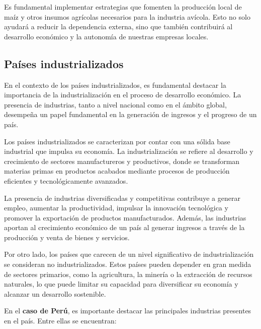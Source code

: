 \documentclass[
  a4paper,
]{article}
\begin{document}
Es fundamental implementar estrategias que fomenten la producción local
de maíz y otros insumos agrícolas necesarios para la industria avícola.
Esto no solo ayudará a reducir la dependencia externa, sino que también
contribuirá al desarrollo económico y la autonomía de nuestras empresas
locales.

\hypertarget{pauxedses-industrializados}{%
\subsection{Países industrializados}\label{pauxedses-industrializados}}

En el contexto de los países industrializados, es fundamental destacar
la importancia de la industrialización en el proceso de desarrollo
económico. La presencia de industrias, tanto a nivel nacional como en el
ámbito global, desempeña un papel fundamental en la generación de
ingresos y el progreso de un país.

Los países industrializados se caracterizan por contar con una sólida
base industrial que impulsa su economía. La industrialización se refiere
al desarrollo y crecimiento de sectores manufactureros y productivos,
donde se transforman materias primas en productos acabados mediante
procesos de producción eficientes y tecnológicamente avanzados.

La presencia de industrias diversificadas y competitivas contribuye a
generar empleo, aumentar la productividad, impulsar la innovación
tecnológica y promover la exportación de productos manufacturados.
Además, las industrias aportan al crecimiento económico de un país al
generar ingresos a través de la producción y venta de bienes y
servicios.

Por otro lado, los países que carecen de un nivel significativo de
industrialización se consideran no industrializados. Estos países pueden
depender en gran medida de sectores primarios, como la agricultura, la
minería o la extracción de recursos naturales, lo que puede limitar su
capacidad para diversificar su economía y alcanzar un desarrollo
sostenible.

En el \textbf{caso de Perú}, es importante destacar las principales
industrias presentes en el país. Entre ellas se encuentran:
\end{document}
